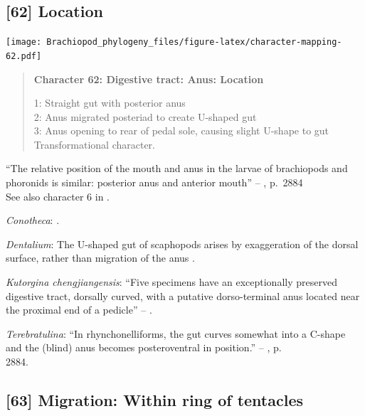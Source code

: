 \documentclass[openany]{book}
\begin{document}
\subsection*{{[}62{]} Location}\label{location}

\texttt{[image: Brachiopod\_phylogeny\_files/figure-latex/character-mapping-62.pdf]}

\begin{quote}
\textbf{Character 62: Digestive tract: Anus: Location}

1: Straight gut with posterior anus\\
2: Anus migrated posteriad to create U-shaped gut\\
3: Anus opening to rear of pedal sole, causing slight U-shape to gut\\
Transformational character.
\end{quote}

``The relative position of the mouth and anus in the larvae of
brachiopods and phoronids is similar: posterior anus and anterior
mouth'' -- \citet{Williams2007Supplement}, p.~2884\\
See also character 6 in \citet{Haszprunar2008}.

\hypertarget{Conotheca-coding-62}{}
\emph{Conotheca}: \citep{Devaere2014}.

\hypertarget{Dentalium-coding-62}{}
\emph{Dentalium}: The U-shaped gut of scaphopods arises by exaggeration
of the dorsal surface, rather than migration of the anus
\citep{Steiner1992}.

\hypertarget{Kutorgina_chengjiangensis-coding-62}{}
\emph{Kutorgina chengjiangensis}: ``Five specimens have an exceptionally
preserved digestive tract, dorsally curved, with a putative
dorso-terminal anus located near the proximal end of a pedicle'' --
\citet{Zhang2007Rhynchonelliformeanbrachiopods}.

\hypertarget{Terebratulina-coding-62}{}
\emph{Terebratulina}: ``In rhynchonelliforms, the gut curves somewhat
into a C-shape and the (blind) anus becomes posteroventral in
position.'' -- \citet{Williams2007Supplement}, p.\\
2884.

\subsection*{{[}63{]} Migration: Within ring of
tentacles}\label{migration-within-ring-of-tentacles}
\end{document}
